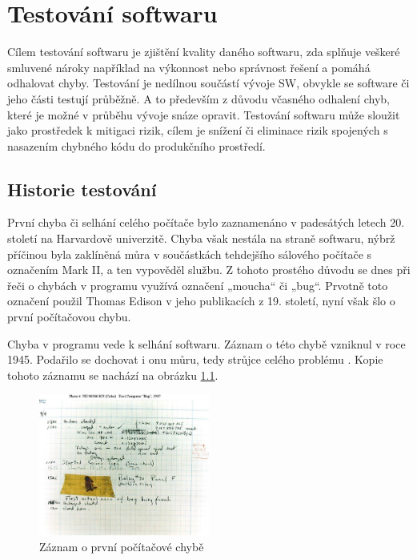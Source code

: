 \chapter{Testování softwaru}
Cílem testování softwaru je zjištění kvality daného softwaru, zda splňuje veškeré smluvené nároky například na výkonnost nebo správnost řešení a pomáhá odhalovat chyby. Testování je nedílnou součástí vývoje SW, obvykle se software či jeho části testují průběžně. A to především z důvodu včasného odhalení chyb, které je možné v průběhu vývoje snáze opravit. Testování softwaru může sloužit jako prostředek k mitigaci rizik, cílem je snížení či eliminace rizik spojených s nasazením chybného kódu do produkčního prostředí.

\section{Historie testování}
První chyba či selhání celého počítače bylo zaznamenáno v padesátých letech 20. století na Harvardově univerzitě. Chyba však nestála na straně softwaru, nýbrž příčinou byla zaklíněná můra v součástkách tehdejšího sálového počítače s označením Mark II, a ten vypověděl službu. Z tohoto prostého důvodu se dnes při řeči o chybách v programu využívá označení „moucha“ či „bug“. Prvotně toto označení použil Thomas Edison v jeho publikacích z 19. století, nyní však šlo o první počítačovou chybu. 

Chyba v programu vede k selhání softwaru. Záznam o této chybě vzniknul v roce 1945. Podařilo se dochovat i onu můru, tedy strůjce celého problému \cite{85SxcMZY6LKfV8v4}. Kopie tohoto záznamu se nachází na obrázku \ref{fig:zaznam-o-prvni-chybe}.


\begin{figure}[!h]
	\centering
	\includegraphics[width=0.5\textwidth]{Figures/first-pc-bug.jpg}
	\caption{Záznam o první počítačové chybě \cite{85SxcMZY6LKfV8v4}}
	\label{fig:zaznam-o-prvni-chybe}
\end{figure}

